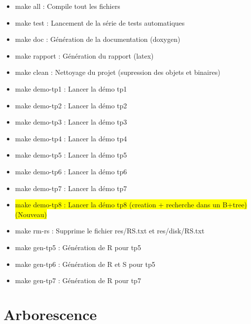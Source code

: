 \documentclass[a4paper]{article}
\begin{document}
\begin{itemize}
	\item make all : Compile tout les fichiers
	\item make test : Lancement de la série de tests automatiques
	\item make doc  : Génération de la documentation (doxygen)
	\item make rapport : Génération du rapport (latex)
	\item make clean : Nettoyage du projet (supression des objets et binaires)
	\item make demo-tp1 : Lancer la démo tp1
	\item make demo-tp2 : Lancer la démo tp2
	\item make demo-tp3 : Lancer la démo tp3
	\item make demo-tp4 : Lancer la démo tp4
	\item make demo-tp5 : Lancer la démo tp5
  \item make demo-tp6 : Lancer la démo tp6
  \item make demo-tp7 : Lancer la démo tp7
  \item \colorbox{yellow}{make demo-tp8 : Lancer la démo tp8 (creation + recherche dans un B+tree) (Nouveau)}
	\item make rm-rs : Supprime le fichier res/RS.txt et res/disk/RS.txt
  \item make gen-tp5 : Génération de R pour tp5
  \item make gen-tp6 : Génération de R et S pour tp5
  \item make gen-tp7 : Génération de R pour tp7
\end{itemize}

\section{Arborescence}
\end{document}
